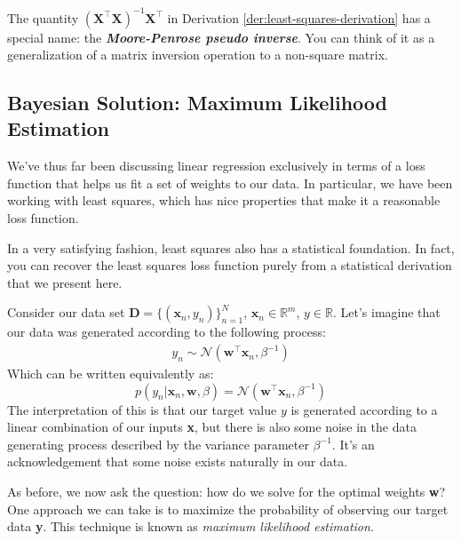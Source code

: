 The quantity $(\textbf{X}^\top\textbf{X})^{-1}\textbf{X}^\top$ in Derivation \ref{der:least-squares-derivation} has a special name: the \textbf{\textit{Moore-Penrose pseudo inverse}}. You can think of it as a generalization of a matrix inversion operation to a non-square matrix.

\subsection{Bayesian Solution: Maximum Likelihood Estimation}
We've thus far been discussing linear regression exclusively in terms of a loss function that helps us fit a set of weights to our data. In particular, we have been working with least squares, which has nice properties that make it a reasonable loss function.

In a very satisfying fashion, least squares also has a statistical foundation. In fact, you can recover the least squares loss function purely from a statistical derivation that we present here.

Consider our data set $\textbf{D} = \{(\textbf{x}_{n}, y_{n})\}_{n = 1}^{N}$, $\textbf{x}_{n} \in\mathbb{R}^m$, $y \in\mathbb{R}$. Let's imagine that our data was generated according to the following process:
\begin{align*}
    y_{n} \sim \mathcal{N}(\textbf{w}^\top\textbf{x}_{n}, \beta^{-1})
\end{align*}
Which can be written equivalently as:
\begin{equation} \label{normal-over-w}
    p(y_{n} | \textbf{x}_{n}, \textbf{w}, \beta) = \mathcal{N}(\textbf{w}^\top\textbf{x}_{n}, \beta^{-1})
\end{equation}
The interpretation of this is that our target value $y$ is generated according to a linear combination of our inputs \textbf{x}, but there is also some noise in the data generating process described by the variance parameter $\beta^{-1}$. It's an acknowledgement that some noise exists naturally in our data.


As before, we now ask the question: how do we solve for the optimal weights \textbf{w}? One approach we can take is to maximize the probability of observing our target data \textbf{y}. This technique is known as \textit{maximum likelihood estimation}.

